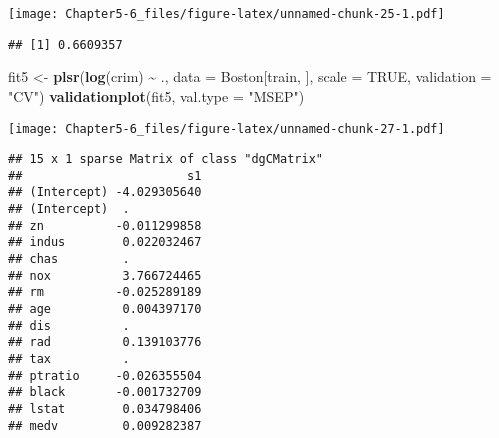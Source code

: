 \documentclass[
]{article}
\newenvironment{Shaded}{\begin{snugshade}}{\end{snugshade}}
\newcommand{\AttributeTok}[1]{\textcolor[rgb]{0.13,0.29,0.53}{#1}}
\newcommand{\ConstantTok}[1]{\textcolor[rgb]{0.56,0.35,0.01}{#1}}
\newcommand{\DecValTok}[1]{\textcolor[rgb]{0.00,0.00,0.81}{#1}}
\newcommand{\FunctionTok}[1]{\textcolor[rgb]{0.13,0.29,0.53}{\textbf{#1}}}
\newcommand{\NormalTok}[1]{#1}
\newcommand{\OtherTok}[1]{\textcolor[rgb]{0.56,0.35,0.01}{#1}}
\newcommand{\SpecialCharTok}[1]{\textcolor[rgb]{0.81,0.36,0.00}{\textbf{#1}}}
\newcommand{\StringTok}[1]{\textcolor[rgb]{0.31,0.60,0.02}{#1}}
\begin{document}
\texttt{[image: Chapter5-6\_files/figure-latex/unnamed-chunk-25-1.pdf]}

\begin{Shaded}
\end{Shaded}

\begin{verbatim}
## [1] 0.6609357
\end{verbatim}

\begin{Shaded}
\begin{Highlighting}[]
\NormalTok{fit5 }\OtherTok{\textless{}{-}} \FunctionTok{plsr}\NormalTok{(}\FunctionTok{log}\NormalTok{(crim) }\SpecialCharTok{\textasciitilde{}}\NormalTok{ ., }\AttributeTok{data =}\NormalTok{ Boston[train, ], }\AttributeTok{scale =} \ConstantTok{TRUE}\NormalTok{, }\AttributeTok{validation =} \StringTok{"CV"}\NormalTok{)}
\FunctionTok{validationplot}\NormalTok{(fit5, }\AttributeTok{val.type =} \StringTok{"MSEP"}\NormalTok{)}
\end{Highlighting}
\end{Shaded}

\texttt{[image: Chapter5-6\_files/figure-latex/unnamed-chunk-27-1.pdf]}

\begin{Shaded}
\end{Shaded}

\begin{verbatim}
## 15 x 1 sparse Matrix of class "dgCMatrix"
##                       s1
## (Intercept) -4.029305640
## (Intercept)  .          
## zn          -0.011299858
## indus        0.022032467
## chas         .          
## nox          3.766724465
## rm          -0.025289189
## age          0.004397170
## dis          .          
## rad          0.139103776
## tax          .          
## ptratio     -0.026355504
## black       -0.001732709
## lstat        0.034798406
## medv         0.009282387
\end{verbatim}
\end{document}
